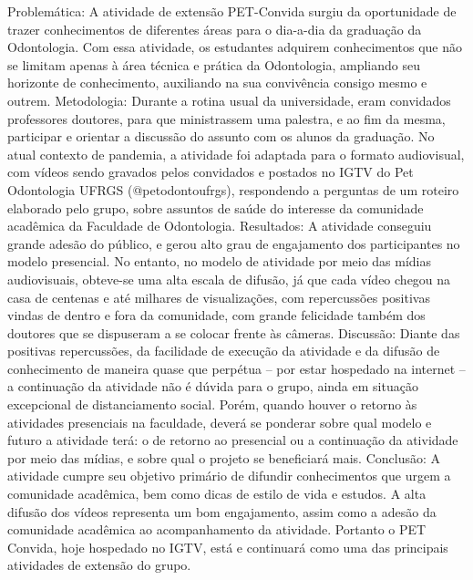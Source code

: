 Problemática: A atividade de extensão PET-Convida surgiu da oportunidade de trazer 
conhecimentos de diferentes áreas para o dia-a-dia da graduação da Odontologia. Com essa 
atividade, os estudantes adquirem conhecimentos que não se limitam apenas à área técnica e 
prática da Odontologia, ampliando seu horizonte de conhecimento, auxiliando na sua convivência 
consigo mesmo e outrem. 
Metodologia: Durante a rotina usual da universidade, eram convidados professores doutores, para 
que ministrassem uma palestra, e ao fim da mesma, participar e orientar a discussão do assunto 
com os alunos da graduação. No atual contexto de pandemia, a atividade foi adaptada para o 
formato audiovisual, com vídeos sendo gravados pelos convidados e postados no IGTV do Pet 
Odontologia UFRGS (@petodontoufrgs), respondendo a perguntas de um roteiro elaborado pelo 
grupo, sobre assuntos de saúde do interesse da comunidade acadêmica da Faculdade de 
Odontologia. 
Resultados: A atividade conseguiu grande adesão do público, e gerou alto grau de engajamento 
dos participantes no modelo presencial. No entanto, no modelo de atividade por meio das mídias 
audiovisuais, obteve-se uma alta escala de difusão, já que cada vídeo chegou na casa de centenas 
e até milhares de visualizações, com repercussões positivas vindas de dentro e fora da comunidade, 
com grande felicidade também dos doutores que se dispuseram a se colocar frente às câmeras. 
Discussão: Diante das positivas repercussões, da facilidade de execução da atividade e da difusão 
de conhecimento de maneira quase que perpétua – por estar hospedado na internet – a continuação 
da atividade não é dúvida para o grupo, ainda em situação excepcional de distanciamento social. 
Porém, quando houver o retorno às atividades presenciais na faculdade, deverá se ponderar sobre 
qual modelo e futuro a atividade terá: o de retorno ao presencial ou a continuação da atividade por 
meio das mídias, e sobre qual o projeto se beneficiará mais. 
Conclusão: A atividade cumpre seu objetivo primário de difundir conhecimentos que urgem a 
comunidade acadêmica, bem como dicas de estilo de vida e estudos. A alta difusão dos vídeos 
representa um bom engajamento, assim como a adesão da comunidade acadêmica ao 
acompanhamento da atividade. Portanto o PET Convida, hoje hospedado no IGTV, está e 
continuará como uma das principais atividades de extensão do grupo.




